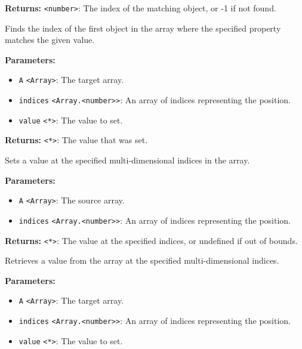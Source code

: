 \documentclass[12pt,a4paper]{article}
\begin{document}
\noindent \textbf{Returns:} \texttt{<number>}: The index of the matching object, or -1 if not found.

\noindent Finds the index of the first object in the array where the specified property matches the given value.

\vspace{5mm}
\noindent {}


\noindent \textbf{Parameters:}
\begin{itemize}
  \item \texttt{A} \texttt{<Array>}: The target array.
  \item \texttt{indices} \texttt{<Array.<number>>}: An array of indices representing the position.
  \item \texttt{value} \texttt{<*>}: The value to set.
\end{itemize}

\noindent \textbf{Returns:} \texttt{<*>}: The value that was set.

\noindent Sets a value at the specified multi-dimensional indices in the array.

\vspace{5mm}
\noindent {}


\noindent \textbf{Parameters:}
\begin{itemize}
  \item \texttt{A} \texttt{<Array>}: The source array.
  \item \texttt{indices} \texttt{<Array.<number>>}: An array of indices representing the position.
\end{itemize}

\noindent \textbf{Returns:} \texttt{<*>}: The value at the specified indices, or undefined if out of bounds.

\noindent Retrieves a value from the array at the specified multi-dimensional indices.

\vspace{5mm}
\noindent {}


\noindent \textbf{Parameters:}
\begin{itemize}
  \item \texttt{A} \texttt{<Array>}: The target array.
  \item \texttt{indices} \texttt{<Array.<number>>}: An array of indices representing the position.
  \item \texttt{value} \texttt{<*>}: The value to set.
\end{itemize}
\end{document}
